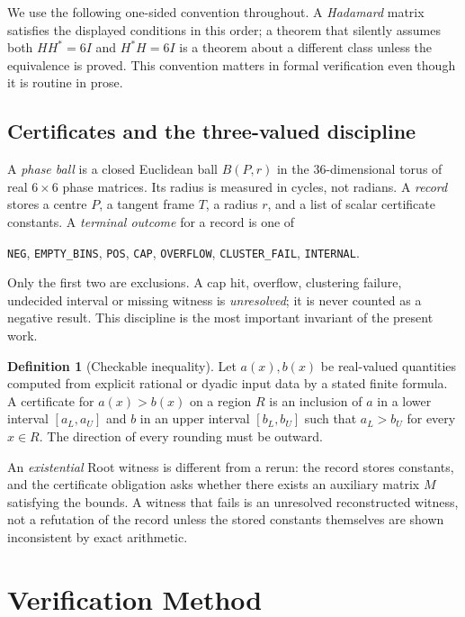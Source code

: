 \documentclass[10pt]{article}
\theoremstyle{definition}
\newtheorem{definition}[theorem]{Definition}
\begin{document}
We use the following one-sided convention throughout. A \emph{Hadamard} matrix satisfies the displayed conditions in this order; a theorem that silently assumes both $HH^*=6I$ and $H^*H=6I$ is a theorem about a different class unless the equivalence is proved. This convention matters in formal verification even though it is routine in prose.

\subsection{Certificates and the three-valued discipline}

A \emph{phase ball} is a closed Euclidean ball $B(P,r)$ in the $36$-dimensional torus of real $6\times6$ phase matrices. Its radius is measured in cycles, not radians. A \emph{record} stores a centre $P$, a tangent frame $T$, a radius $r$, and a list of scalar certificate constants. A \emph{terminal outcome} for a record is one of
\begin{center}
\texttt{NEG}, \texttt{EMPTY\_BINS}, \texttt{POS}, \texttt{CAP}, \texttt{OVERFLOW}, \texttt{CLUSTER\_FAIL}, \texttt{INTERNAL}.
\end{center}
Only the first two are exclusions. A cap hit, overflow, clustering failure, undecided interval or missing witness is \emph{unresolved}; it is never counted as a negative result. This discipline is the most important invariant of the present work.

\begin{definition}[Checkable inequality]
Let $a(x),b(x)$ be real-valued quantities computed from explicit rational or dyadic input data by a stated finite formula. A certificate for $a(x)>b(x)$ on a region $R$ is an inclusion of $a$ in a lower interval $[a_L,a_U]$ and $b$ in an upper interval $[b_L,b_U]$ such that $a_L>b_U$ for every $x\in R$. The direction of every rounding must be outward.
\end{definition}

An \emph{existential} Root witness is different from a rerun: the record stores constants, and the certificate obligation asks whether there exists an auxiliary matrix $M$ satisfying the bounds. A witness that fails is an unresolved reconstructed witness, not a refutation of the record unless the stored constants themselves are shown inconsistent by exact arithmetic.

\section{Verification Method}
\end{document}
